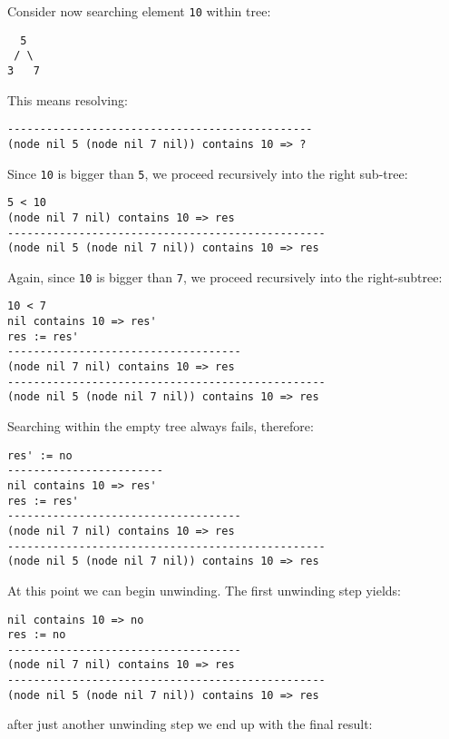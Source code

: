 Consider now searching element \texttt{10} within tree:

\begin{lstlisting}
  5
 / \
3   7
\end{lstlisting}

This means resolving:

\begin{lstlisting}
-----------------------------------------------
(node nil 5 (node nil 7 nil)) contains 10 => ?
\end{lstlisting}

Since \texttt{10} is bigger than \texttt{5}, we proceed recursively into the right sub-tree:

\begin{lstlisting}
5 < 10
(node nil 7 nil) contains 10 => res
-------------------------------------------------
(node nil 5 (node nil 7 nil)) contains 10 => res
\end{lstlisting}

Again, since \texttt{10} is bigger than \texttt{7}, we proceed recursively into the right-subtree:

\begin{lstlisting}
10 < 7
nil contains 10 => res'
res := res'
------------------------------------
(node nil 7 nil) contains 10 => res
-------------------------------------------------
(node nil 5 (node nil 7 nil)) contains 10 => res
\end{lstlisting}

Searching within the empty tree always fails, therefore:

\begin{lstlisting}
res' := no
------------------------
nil contains 10 => res'
res := res'
------------------------------------
(node nil 7 nil) contains 10 => res
-------------------------------------------------
(node nil 5 (node nil 7 nil)) contains 10 => res
\end{lstlisting}

At this point we can begin unwinding. The first unwinding step yields:

\begin{lstlisting}
nil contains 10 => no
res := no
------------------------------------
(node nil 7 nil) contains 10 => res
-------------------------------------------------
(node nil 5 (node nil 7 nil)) contains 10 => res
\end{lstlisting}

after just another unwinding step we end up with the final result:

